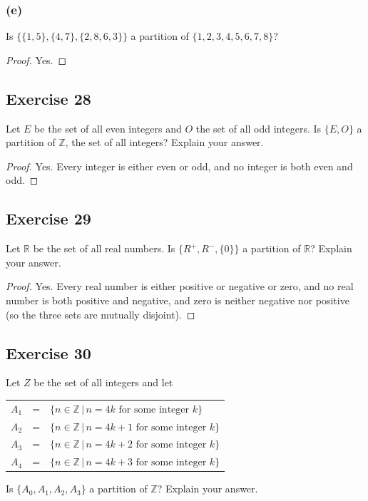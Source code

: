 \documentclass[14pt]{extarticle}
\newcommand{\R}{\mathbb{R}}
\newcommand{\Z}{\mathbb{Z}}
\begin{document}
\subsubsection{(e)}
Is \(\{\{1, 5\}, \{4, 7\}, \{2, 8, 6, 3\}\}\) a partition of \(\{1, 2, 3, 4, 5, 6, 7, 8\}\)?

\begin{proof}
Yes.
\end{proof}

\subsection{Exercise 28}
Let $E$ be the set of all even integers and $O$ the set of all odd integers. Is \(\{E, O\}\) a partition of $\Z$, the set of all integers? Explain your answer.

\begin{proof}
Yes. Every integer is either even or odd, and no integer is both even and odd.
\end{proof}

\subsection{Exercise 29}
Let $\R$ be the set of all real numbers. Is $\{R^+, R^-, \{0\}\}$ a partition of $\R$? Explain your answer.

\begin{proof}
Yes. Every real number is either positive or negative or zero, and no real number is both positive and negative, and 
zero is neither negative nor positive (so the three sets are mutually disjoint).
\end{proof}

\subsection{Exercise 30}
Let $Z$ be the set of all integers and let
\begin{center}
\begin{tabular}{rcl}
$A_1$ & = & \(\{n \in \Z \, | \, n = 4k \text{ for some integer } k\}\) \\
$A_2$ & = & \(\{n \in \Z \, | \, n = 4k + 1 \text{ for some integer } k\}\) \\
$A_3$ & = & \(\{n \in \Z \, | \, n = 4k + 2 \text{ for some integer } k\}\) \\
$A_4$ & = & \(\{n \in \Z \, | \, n = 4k + 3 \text{ for some integer } k\}\) 
\end{tabular}
\end{center}
Is \(\{A_0, A_1, A_2, A_3\}\) a partition of $\Z$? Explain your answer.
\end{document}
